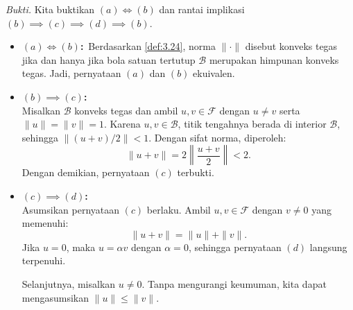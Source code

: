 \documentclass[aspectratio=169,11pt]{beamer}
\theoremstyle{definition}
\newcommand{\myref}[1]{\hyperref[#1]{\nameCref{#1} \ref*{#1}}}
\begin{document}
\begin{frame}[allowframebreaks]{\insertsection}{\insertsubsection}
  \textit{Bukti.}
  Kita buktikan $(a) \iff (b)$ dan rantai implikasi $(b) \implies (c) \implies (d) \implies (b)$.

  \begin{itemize}
    \item \textbf{$(a) \iff (b)$:}\
          Berdasarkan \myref{def:3.24}, norma $\|\cdot\|$ disebut konveks tegas jika dan hanya jika bola satuan tertutup $\mathcal{B}$ merupakan himpunan konveks tegas. Jadi, pernyataan $(a)$ dan $(b)$ ekuivalen.
    \item   \textbf{$(b) \implies (c)$:}\\
          Misalkan $\mathcal{B}$ konveks tegas dan ambil $u,v \in \mathcal{F}$ dengan $u \neq v$ serta $\|u\| = \|v\| = 1$. Karena $u,v \in \mathcal{B}$, titik tengahnya berada di interior $\mathcal{B}$, sehingga $\left\|(u+v)/2\right\| < 1$.
          Dengan sifat norma, diperoleh:
          \begin{equation*}
            \|u+v\| = 2\left\|\frac{u+v}{2}\right\| < 2.
          \end{equation*}
          Dengan demikian, pernyataan $(c)$ terbukti.
    \item \textbf{$(c) \implies (d)$:}\\
          Asumsikan pernyataan $(c)$ berlaku. Ambil $u,v \in \mathcal{F}$ dengan $v \neq 0$ yang memenuhi:
          \begin{equation*}
            \|u+v\| = \|u\| + \|v\|.
          \end{equation*}
          Jika $u=0$, maka $u=\alpha v$ dengan $\alpha=0$, sehingga pernyataan $(d)$ langsung terpenuhi.

          Selanjutnya, misalkan $u \neq 0$. Tanpa mengurangi keumuman, kita dapat mengasumsikan $\|u\| \leq \|v\|$.


\end{itemize}
\end{frame}
\end{document}
